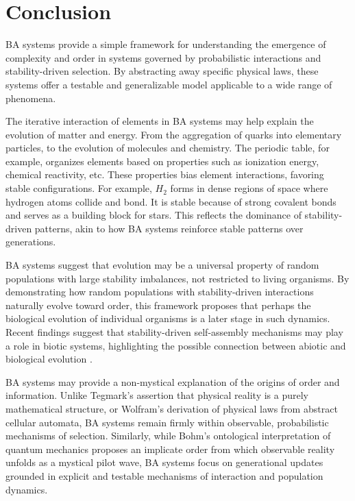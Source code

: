\documentclass[preprint,12pt]{elsarticle}
\begin{document}
\section{Conclusion}

BA systems provide a simple framework for understanding the emergence of complexity and order in systems governed by probabilistic interactions and stability-driven selection. By abstracting away specific physical laws, these systems offer a testable and generalizable model applicable to a wide range of phenomena. 

The iterative interaction of elements in BA systems may help explain the evolution of matter and energy. From the aggregation of quarks into elementary particles, to the evolution of molecules and chemistry. The periodic table, for example, organizes elements based on properties such as ionization energy, chemical reactivity, etc. These properties bias element interactions, favoring stable configurations. For example, \( H_2 \) forms in dense regions of space where hydrogen atoms collide and bond. It is stable because of strong covalent bonds and serves as a building block for stars. This reflects the dominance of stability-driven patterns, akin to how BA systems reinforce stable patterns over generations. 

BA systems suggest that evolution may be a universal property of random populations with large stability imbalances, not restricted to living organisms. By demonstrating how random populations with stability-driven interactions naturally evolve toward order, this framework proposes that perhaps the biological evolution of individual organisms is a later stage in such dynamics. Recent findings suggest that stability-driven self-assembly mechanisms may play a role in biotic systems, highlighting the possible connection between abiotic and biological evolution \cite{davies2022selfassembly}.

BA systems may provide a non-mystical explanation of the origins of order and information. Unlike Tegmark's \cite{tegmark2008mathematical} assertion that physical reality is a purely mathematical structure, or Wolfram's \cite{wolfram2020fundamental} derivation of physical laws from abstract cellular automata, BA systems remain firmly within observable, probabilistic mechanisms of selection. Similarly, while Bohm's ontological interpretation of quantum mechanics \cite{bohm1980wholeness} proposes an implicate order from which observable reality unfolds as a mystical pilot wave, BA systems focus on generational updates grounded in explicit and testable mechanisms of interaction and population dynamics.
\end{document}

